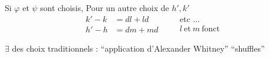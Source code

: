  Si \(\varphi\) et \(\psi\) sont choisis, Pour un autre choix de \(h',k'\)
\[
\begin{aligned}
k'-k&=dl+ld\\
h'-h&=dm+md
\end{aligned}
\quad\begin{aligned}&\text{etc \ldots}\\&l\ \text{et}\ m\ \text{fonct}\end{aligned}
\]

 \(\exists\) des choix traditionnels : \textquotedblleft application d'Alexander Whitney\textquotedblright{} \textquotedblleft shuffles\textquotedblright

